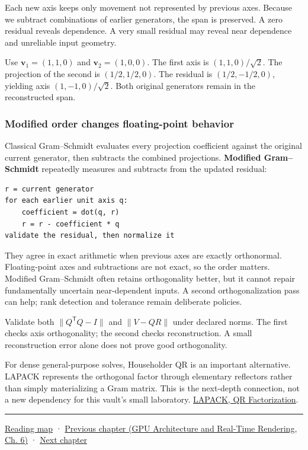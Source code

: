 Each new axis keeps only movement not represented by previous axes. Because we subtract combinations of earlier generators, the span is preserved. A zero residual reveals dependence. A very small residual may reveal near dependence and unreliable input geometry.

Use \(\mathbf v_1=(1,1,0)\) and \(\mathbf v_2=(1,0,0)\). The first axis is \((1,1,0)/\sqrt2\). The projection of the second is \((1/2,1/2,0)\). The residual is \((1/2,-1/2,0)\), yielding axis \((1,-1,0)/\sqrt2\). Both original generators remain in the reconstructed span.

\subsubsection{Modified order changes floating-point behavior}\label{01-foundations-i-ch017-modified-order-changes-floating-point-behavior}

Classical Gram--Schmidt evaluates every projection coefficient against the original current generator, then subtracts the combined projections. \textbf{Modified Gram--Schmidt} repeatedly measures and subtracts from the updated residual:

\begin{verbatim}
r = current generator
for each earlier unit axis q:
    coefficient = dot(q, r)
    r = r - coefficient * q
validate the residual, then normalize it
\end{verbatim}

They agree in exact arithmetic when previous axes are exactly orthonormal. Floating-point axes and subtractions are not exact, so the order matters. Modified Gram--Schmidt often retains orthogonality better, but it cannot repair fundamentally uncertain near-dependent inputs. A second orthogonalization pass can help; rank detection and tolerance remain deliberate policies.

Validate both \(\|Q^\mathsf TQ-I\|\) and \(\|V-QR\|\) under declared norms. The first checks axis orthogonality; the second checks reconstruction. A small reconstruction error alone does not prove good orthogonality.

For dense general-purpose solves, Householder QR is an important alternative. LAPACK represents the orthogonal factor through elementary reflectors rather than simply materializing a Gram matrix. This is the next-depth connection, not a new dependency for this vault's small laboratory. \href{https://www.netlib.org/lapack/lug/node40.html}{LAPACK, QR Factorization}.

\begin{center}\rule{0.5\linewidth}{0.5pt}\end{center}

\hyperref[volume-reading-map]{Reading map} · \href{../06-GPU-Architecture-and-Real-Time-Rendering/main.pdf\#nameddest=01-foundations-i-ch016-profile-gpus-and-respect-apple-ownership-boundaries}{Previous chapter (GPU Architecture and Real-Time Rendering, Ch. 6)} · \hyperref[01-foundations-i-ch018-vectors-for-light-and-frames]{Next chapter}
